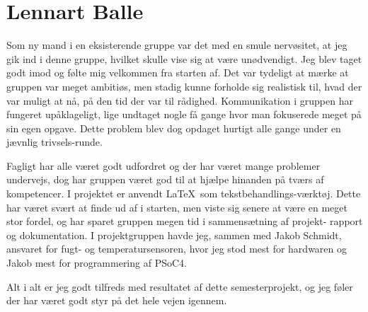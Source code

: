 \section{Lennart Balle}
Som ny mand i en eksisterende gruppe var det med en smule nervøsitet, at jeg gik ind i denne gruppe, hvilket skulle vise sig at være unødvendigt. Jeg blev taget godt imod og følte mig velkommen fra starten af. Det var tydeligt at mærke at gruppen var meget ambitiøs, men stadig kunne forholde sig realistisk til, hvad der var muligt at nå, på den tid der var til rådighed. Kommunikation i gruppen har fungeret upåklageligt, lige undtaget nogle få gange hvor man fokuserede meget på sin egen opgave. Dette problem blev dog opdaget hurtigt alle gange under en jævnlig trivsels-runde.

Fagligt har alle været godt udfordret og der har været mange problemer undervejs, dog har gruppen været god til at hjælpe hinanden på tværs af kompetencer. I projektet er anvendt \LaTeX\ som tekstbehandlings-værktøj. Dette har været svært at finde ud af i starten, men viste sig senere at være en meget stor fordel, og har sparet gruppen megen tid i sammensætning af projekt- rapport og dokumentation. I projektgruppen havde jeg, sammen med Jakob Schmidt, ansvaret for fugt- og temperatursensoren, hvor jeg stod mest for hardwaren og Jakob mest for programmering af PSoC4. 

Alt i alt er jeg godt tilfreds med resultatet af dette semesterprojekt, og jeg føler der har været godt styr på det hele vejen igennem.